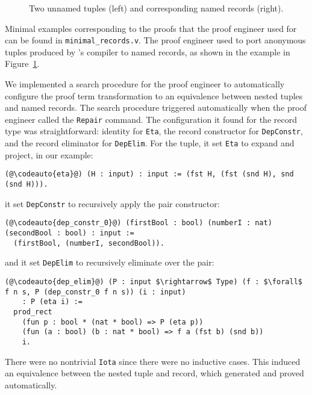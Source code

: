 \begin{figure}
\begin{minipage}{0.25\textwidth}
   
\end{minipage}
\hfill
\begin{minipage}{0.74\textwidth}
   
\end{minipage}
\caption{Two unnamed tuples (left) and corresponding named records (right).}
\label{fig:records}
\end{figure}

Minimal examples corresponding to the proofs that the proof engineer used \toolname for
can be found in \lstinline{minimal_records.v}.
The proof engineer used \toolname to port anonymous tuples produced by \company's compiler
to named records, as shown in the example in Figure~\ref{fig:records}.

We implemented a search procedure for the proof engineer to automatically configure the proof term transformation to an equivalence
between nested tuples and named records.
The search procedure triggered automatically when the proof engineer called the \lstinline{Repair} command.
The configuration it found for the record type was straightforward: identity for \lstinline{Eta},
the record constructor for \lstinline{DepConstr}, and the record eliminator for \lstinline{DepElim}.
For the tuple, it set \lstinline{Eta} to expand and project, in our example:
\begin{lstlisting}
(@\codeauto{eta}@) (H : input) : input := (fst H, (fst (snd H), snd (snd H))).
\end{lstlisting}
it set \lstinline{DepConstr} to recursively apply the pair constructor:

\begin{lstlisting}
(@\codeauto{dep_constr_0}@) (firstBool : bool) (numberI : nat) (secondBool : bool) : input :=
  (firstBool, (numberI, secondBool)).
\end{lstlisting}
and it set \lstinline{DepElim} to recursively eliminate over the pair:

\begin{lstlisting}
(@\codeauto{dep_elim}@) (P : input $\rightarrow$ Type) (f : $\forall$ f n s, P (dep_constr_0 f n s)) (i : input)
    : P (eta i) :=
  prod_rect
    (fun p : bool * (nat * bool) => P (eta p))
    (fun (a : bool) (b : nat * bool) => f a (fst b) (snd b))
    i.
\end{lstlisting}
There were no nontrivial \lstinline{Iota} since there were no inductive cases.
This induced an equivalence between the nested tuple and record,
which \toolname generated and proved automatically.

